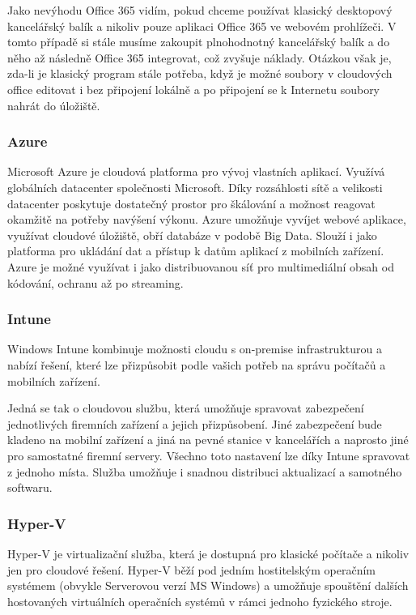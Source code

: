 Jako nevýhodu Office 365 vidím, pokud chceme používat klasický desktopový kancelářský balík a nikoliv pouze aplikaci Office 365 ve webovém prohlížeči. V tomto případě si stále musíme zakoupit plnohodnotný kancelářský balík a do něho až následně Office 365 integrovat, což zvyšuje náklady. Otázkou však je, zda-li je klasický program stále potřeba, když je možné soubory v cloudových office editovat i bez připojení lokálně a po připojení se k Internetu soubory nahrát do úložiště.

\subsubsection{Azure}
Microsoft Azure je cloudová platforma pro vývoj vlastních aplikací. Využívá globálních datacenter společnosti Microsoft. Díky rozsáhlosti sítě a velikosti datacenter poskytuje dostatečný prostor pro škálování a možnost reagovat okamžitě na potřeby navýšení výkonu. Azure umožňuje vyvíjet webové aplikace, využívat cloudové úložiště, obří databáze v podobě Big Data. Slouží i jako platforma pro ukládání dat a přístup k datům aplikací z mobilních zařízení. Azure je možné využívat i jako distribuovanou síť pro multimediální obsah od kódování, ochranu až po streaming. \nocite{ms:azure}

\subsubsection{Intune}
Windows Intune kombinuje možnosti cloudu s on-premise infrastrukturou a nabízí řešení, které lze přizpůsobit podle vašich potřeb na správu počítačů a mobilních zařízení.\cite{ms:intune}

Jedná se tak o cloudovou službu, která umožňuje spravovat zabezpečení jednotlivých firemních zařízení a jejich přizpůsobení. Jiné zabezpečení bude kladeno na mobilní zařízení a jiná na pevné stanice v kancelářích a naprosto jiné pro samostatné firemní servery. Všechno toto nastavení lze díky Intune spravovat z jednoho místa. Služba umožňuje i snadnou distribuci aktualizací a samotného softwaru.

\subsubsection{Hyper-V}
Hyper-V je virtualizační služba, která je dostupná pro klasické počítače a nikoliv jen pro cloudové řešení. Hyper-V běží pod jedním hostitelským operačním systémem (obvykle Serverovou verzí MS Windows) a umožňuje spouštění dalších hostovaných virtuálních operačních systémů v rámci jednoho fyzického stroje.

